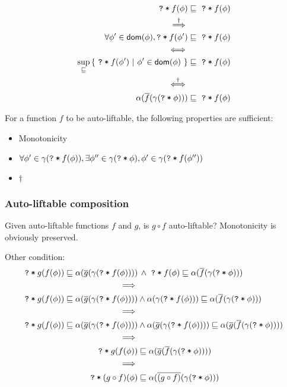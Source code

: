 \documentclass[11pt,a4paper]{article}
\newcommand{\ttt}{\texttt}
\newcommand{\predicate}{\textsf}
\newcommand{\qm}{\ttt{?}}
\newcommand{\withqm}[1]{\ttt{\qm\:*\:$#1$}}
\newcommand{\dom}{\predicate{dom}}
\begin{document}
\begin{align*}
\withqm{f(\phi)} &\sqsubseteq \,\,\withqm{f(\phi)} \\
\overset{\dagger}{\implies} \\
\forall \phi' \in \dom(\phi), \withqm{f(\phi')} &\sqsubseteq \,\,\withqm{f(\phi)} \\
\iff \\
\sup_{\sqsubseteq} {\{~ \withqm{f(\phi')} ~|~ \phi' \in \dom(\phi) ~\}} &\sqsubseteq \,\,\withqm{f(\phi)} \\
\overset{\dagger}{\iff} \\
\alpha(\overline{f}(\gamma(\withqm{\phi}))) &\sqsubseteq \,\,\withqm{f(\phi)}
\end{align*}

For a function $f$ to be auto-liftable, the following properties are sufficient:
\begin{itemize}
    \item Monotonicity
    \item $\forall \phi' \in \gamma(\withqm{f(\phi)}), \exists \phi'' \in \gamma(\withqm{\phi}), \phi' \in \gamma(\withqm{f(\phi'')})$ 
    \item $\dagger$
\end{itemize}

\subsubsection{Auto-liftable composition}
Given auto-liftable functions $f$ and $g$, is $g \circ f$ auto-liftable?
Monotonicity is obviously preserved.

Other condition:
\begin{align*}
\withqm{g(f(\phi))} \sqsubseteq \alpha(\overline{g}(\gamma(\withqm{f(\phi)}))) &\,\wedge
\,\,\withqm{f(\phi)} \sqsubseteq \alpha(\overline{f}(\gamma(\withqm{\phi}))) \\
\implies \\
\withqm{g(f(\phi))} \sqsubseteq \alpha(\overline{g}(\gamma(\withqm{f(\phi)}))) &\wedge
\alpha(\gamma(\withqm{f(\phi)})) \sqsubseteq \alpha(\overline{f}(\gamma(\withqm{\phi}))) \\
\implies \\
\withqm{g(f(\phi))} \sqsubseteq \alpha(\overline{g}(\gamma(\withqm{f(\phi)}))) &\wedge
\alpha(\overline{g}(\gamma(\withqm{f(\phi)}))) \sqsubseteq \alpha(\overline{g}(\overline{f}(\gamma(\withqm{\phi})))) \\
\implies \\
\withqm{g(f(\phi))} &\sqsubseteq \alpha(\overline{g}(\overline{f}(\gamma(\withqm{\phi})))) \\
\implies \\
\withqm{(g \circ f)(\phi)} &\sqsubseteq \alpha(\overline{(g \circ f)}(\gamma(\withqm{\phi}))) \\
\end{align*}
\end{document}
